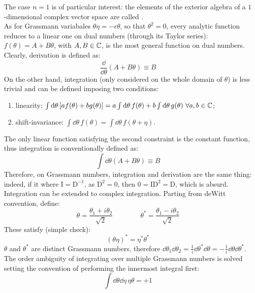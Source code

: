 The case $ n = 1 $ is of particular interest: the elements of the exterior algebra of a $ 1 $-dimensional complex vector space are called . \\
As for Grassmann variabales $ \theta \eta = - \epsilon \theta $, so that $ \theta^2 = 0 $, every analytic function reduces to a linear one on dual numbers (through its Taylor series): $ f(\theta) = A + B \theta $, with $ A,B \in \mathbb{C} $, is the most general function on dual numbers. Clearly, derivation is defined as:
\begin{equation}
  \frac{\dd}{\dd \theta} \left( A + B \theta \right) \equiv B
\end{equation}
On the other hand, integration (only considered on the whole domain of $ \theta $) is less trivial and can be defined imposing two conditions:
\begin{enumerate}
  \item linearity: $ \int \mathrm{d}\theta \left[ a f(\theta) + b g(\theta) \right] = a \int \mathrm{d}\theta\, f(\theta) + b \int \mathrm{d}\theta\, g(\theta) \,\,\forall a,b \in \mathbb{C} $;
  \item shift-invariance: $ \int \dd\theta\, f(\theta) = \int \dd\theta\, f(\theta + \eta) $.
\end{enumerate}
The only linear function satisfying the second constraint is the constant function, thus integration is conventionally defined as:
\begin{equation}
  \int \dd\theta \left( A + B \theta \right) \equiv B
\end{equation}
Therefore, on Grassmann numbers, integration and derivation are the same thing: indeed, if it where $ \text{I} = \text{D}^{-1} $, as $ \text{D}^2 = 0 $, then $ 0 = \text{I} \text{D}^2 = \text{D} $, which is absurd. \\
Integration can be extended to complex integration. Parting from deWitt convention, define:
\begin{equation}
  \theta = \frac{\theta_1 + i \theta_2}{\sqrt{2}}
  \qquad \qquad
  \theta^* = \frac{\theta_1 - i \theta_2}{\sqrt{2}}
\end{equation}
These satisfy (simple check):
\begin{equation}
  (\theta \eta)^* = \eta^* \theta^*
\end{equation}
$ \theta $ and $ \theta^* $ are distinct Grassmann numbers, therefore $ \dd \theta_1 \dd \theta_2 = \frac{1}{i} \dd \theta 
^* \dd \theta = - \frac{1}{i} \dd \theta \dd \theta^* $. The order ambiguity of integrating over multiple Grassmann numbers is solved setting the convention of performing the innermost integral first:
\begin{equation}
  \int \dd \theta \dd \eta\, \eta \theta = +1
\end{equation}

